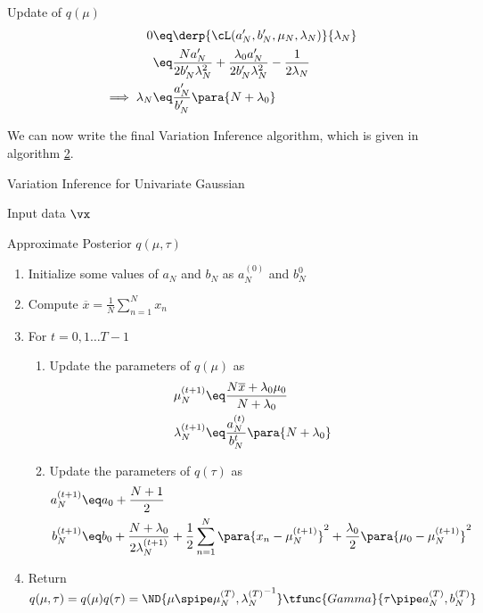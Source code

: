 \documentclass{article}
\begin{document}
\begin{question}
\begin{qsubsection}{\boldmath Update of $q(\mu)$}
		\begin{align*}
			0	&\eq	\derp{\cL(a'_N, b'_N, \mu_N, \lambda_N)}{\lambda_N} \\
			&\eq	\frac{N a'_N}{2 b'_N \lambda_N^2} + \frac{\lambda_0 a'_N}{2 b'_N \lambda_N^2} - \frac{1}{2 \lambda_N} \\
			\implies \lambda_N	&\eq	\frac{a'_N}{b'_N} \para{N + \lambda_0}
		\end{align*}


	\end{qsubsection}

	We can now write the final Variation Inference algorithm, which is given in algorithm \hyperlink{algo:2}{2}.

	\begin{algo}[0.9\textwidth]{Variation Inference for Univariate Gaussian}

		 Input data $\vx$ \sbr

		 Approximate Posterior $q(\mu, \tau)$ \sbr

		\begin{enumerate}
			\item Initialize some values of $a_N$ and $b_N$ as $a_N^{(0)}$ and $b_N^{0}$
			\item Compute $\overline{x} = \frac{1}{N} \sum_{n = 1}^N x_n$
			\item For $t = 0, 1 \dots T - 1$
				\begin{enumerate}
					\item Update the parameters of $q(\mu)$ as
						\begin{align*}
							\mu_N^{(t + 1)}	&\eq	\frac{N \overline{x} + \lambda_0 \mu_0}{N + \lambda_0} \\
							\lambda_N^{(t + 1)}	&\eq	\frac{a_N^{(t)}}{b_N^{t}} \para{N + \lambda_0}
						\end{align*}
					\item Update the parameters of $q(\tau)$ as
						\begin{align*}
							a_N^{(t + 1)}	&\eq	a_0 + \frac{N + 1}{2} \\
							b_N^{(t + 1)}	&\eq	b_0 + \frac{N + \lambda_0}{2 \lambda_N^{(t + 1)}} + \frac{1}{2} \sum_{n = 1}^N \para{x_n - \mu_N^{(t + 1)}}^2 + \frac{\lambda_0}{2} \para{\mu_0 - \mu_N^{(t + 1)}}^2
						\end{align*}
				\end{enumerate}
			\item Return $q(\mu, \tau) = q(\mu) q(\tau) = \ND{\mu \spipe \mu_N^{(T)}, {\lambda_N^{(T)}}^{-1}} \tfunc{Gamma}{\tau \pipe a_N^{(T)}, b_N^{(T)}}$
		\end{enumerate}

	\end{algo}

\end{question}
\end{document}
